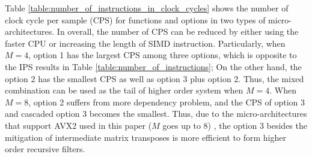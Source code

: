 
Table \ref{table:number_of_instructions_in_clock_cycles} shows the number of clock cycle per sample (CPS)
for functions and options in two types of micro-architectures.
In overall, the number of CPS can be reduced by either using the faster CPU or
increasing the length of SIMD instruction. Particularly, when $M{=}4$,
option 1 has the largest CPS
among three options, which is opposite to the IPS results in Table \ref{table:number_of_instructions};
On the other hand, the option 2 has the smallest CPS as well as option 3 plus option 2.
Thus, the mixed combination can be used as the tail of higher order system when $M{=}4$.
When $M{=}8$, option 2 suffers from more dependency problem, and the CPS of option 3
and cascaded option 3 becomes the smallest. Thus, due to the micro-architectures that support AVX2 used in this paper ($M$ goes up to 8)   
, the option 3 besides the mitigation of 
intermediate matrix transposes is more efficient to
form higher order recursive filters.


